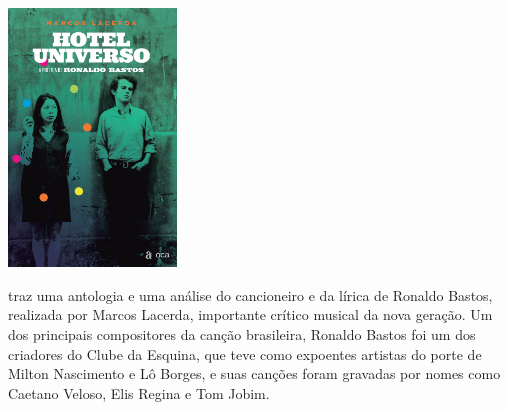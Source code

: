 \begin{center}
\hspace*{-.5cm}\includegraphics[width=44.6mm]{./imgs/universo.jpg}
\end{center}

\hspace*{-7cm}\hrulefill\hspace*{-7cm}

\medskip

 traz uma antologia e uma análise do cancioneiro e da lírica de Ronaldo Bastos, realizada por Marcos Lacerda, importante crítico musical da nova geração. Um dos principais compositores da canção brasileira, Ronaldo Bastos foi um dos criadores do Clube da Esquina, que teve como expoentes artistas do porte de Milton Nascimento e Lô Borges, e suas canções foram gravadas por nomes como Caetano Veloso, Elis Regina e Tom Jobim.

\vfill

\hspace*{-.4cm}\begin{minipage}[c]{1\linewidth}
\small{
{}}
\end{minipage}

\pagebreak

\hspace{.5cm}

